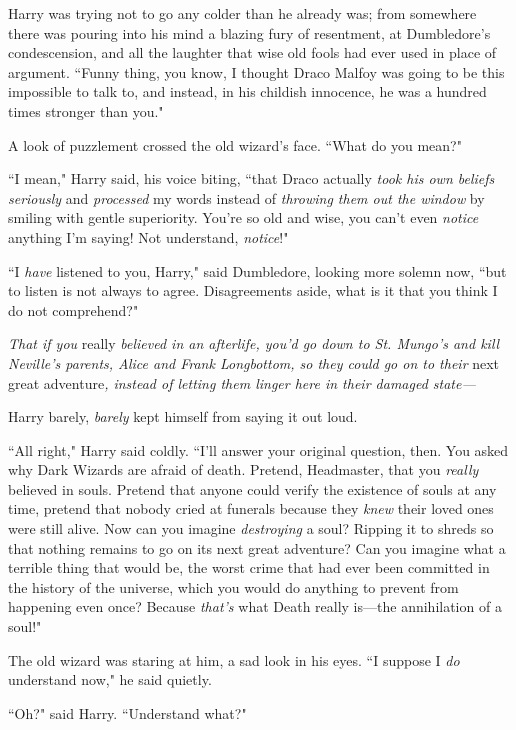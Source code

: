 Harry was trying not to go any colder than he already was; from somewhere there was pouring into his mind a blazing fury of resentment, at Dumbledore's condescension, and all the laughter that wise old fools had ever used in place of argument. ``Funny thing, you know, I thought Draco Malfoy was going to be this impossible to talk to, and instead, in his childish innocence, he was a hundred times stronger than you."

A look of puzzlement crossed the old wizard's face. ``What do you mean?"

``I mean," Harry said, his voice biting, ``that Draco actually \emph{took his own beliefs seriously} and \emph{processed} my words instead of \emph{throwing them out the window} by smiling with gentle superiority. You're so old and wise, you can't even \emph{notice} anything I'm saying! Not understand, \emph{notice}!"

``I \emph{have} listened to you, Harry," said Dumbledore, looking more solemn now, ``but to listen is not always to agree. Disagreements aside, what is it that you think I do not comprehend?"

\emph{That if you} really \emph{believed in an afterlife, you'd go down to St. Mungo's and kill Neville's parents, Alice and Frank Longbottom, so they could go on to their} next great adventure\emph{, instead of letting them linger here in their damaged state—}

Harry barely, \emph{barely} kept himself from saying it out loud.

``All right," Harry said coldly. ``I'll answer your original question, then. You asked why Dark Wizards are afraid of death. Pretend, Headmaster, that you \emph{really} believed in souls. Pretend that anyone could verify the existence of souls at any time, pretend that nobody cried at funerals because they \emph{knew} their loved ones were still alive. Now can you imagine \emph{destroying} a soul? Ripping it to shreds so that nothing remains to go on its next great adventure? Can you imagine what a terrible thing that would be, the worst crime that had ever been committed in the history of the universe, which you would do anything to prevent from happening even once? Because \emph{that's} what Death really is—the annihilation of a soul!"

The old wizard was staring at him, a sad look in his eyes. ``I suppose I \emph{do} understand now," he said quietly.

``Oh?" said Harry. ``Understand what?"

